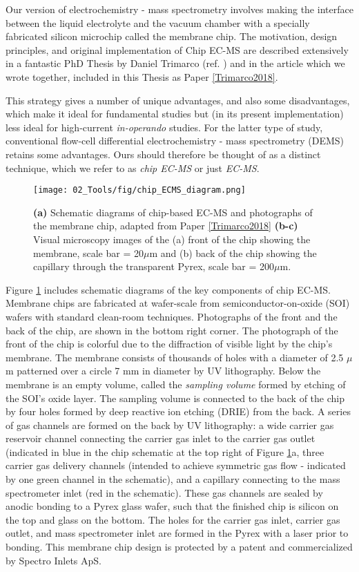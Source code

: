 Our version of electrochemistry - mass spectrometry involves making the interface between the liquid electrolyte and the vacuum chamber with a specially fabricated silicon microchip called the membrane chip. The motivation, design principles, and original implementation of Chip EC-MS are described extensively in a fantastic PhD Thesis by Daniel Trimarco (ref. \cite{Trimarco2017_PhD}) and in the article which we wrote together, included in this Thesis as Paper \ref{Trimarco2018}. 

This strategy gives a number of unique advantages, and also some disadvantages, which make it ideal for fundamental studies but (in its present implementation) less ideal for high-current \textit{in-operando} studies. For the latter type of study, conventional flow-cell differential electrochemistry - mass spectrometry (DEMS)\cite{Baltruschat2004} retains some advantages. Ours should therefore be thought of as a distinct technique, which we refer to as \textit{chip EC-MS} or just \textit{EC-MS}.

\begin{figure}[t]
	\centering
	\texttt{[image: 02\_Tools/fig/chip\_ECMS\_diagram.png]}
	\caption{\textbf{(a)} Schematic diagrams of chip-based EC-MS and photographs of the membrane chip, adapted from Paper \ref{Trimarco2018} \textbf{(b-c)} Visual microscopy images of the (a) front of the chip showing the membrane, scale bar = 20$\mu$m and (b) back of the chip showing the capillary through the transparent Pyrex, scale bar = 200$\mu$m.}
	\label{fig:chipECMS}
\end{figure}

Figure \ref{fig:chipECMS} includes schematic diagrams of the key components of chip EC-MS. Membrane chips are fabricated at wafer-scale from semiconductor-on-oxide (SOI) wafers with standard clean-room techniques. Photographs of the front and the back of the chip, are shown in the bottom right corner. The photograph of the front of the chip is colorful due to the diffraction of visible light by the chip's membrane. The membrane consists of thousands of holes with a diameter of 2.5 $\mu$m patterned over a circle 7 mm in diameter by UV lithography. Below the membrane is an empty volume, called the \textit{sampling volume} formed by etching of the SOI's oxide layer. The sampling volume is connected to the back of the chip by four holes formed by deep reactive ion etching (DRIE) from the back. A series of gas channels are formed on the back by UV lithography: a wide carrier gas reservoir channel connecting the carrier gas inlet to the carrier gas outlet (indicated in blue in the chip schematic at the top right of Figure \ref{fig:chipECMS}a, three carrier gas delivery channels (intended to achieve symmetric gas flow - indicated by one green channel in the schematic), and a capillary connecting to the mass spectrometer inlet (red in the schematic). These gas channels are sealed by anodic bonding to a Pyrex glass wafer, such that the finished chip is silicon on the top and glass on the bottom. The holes for the carrier gas inlet, carrier gas outlet, and mass spectrometer inlet are formed in the Pyrex with a  laser prior to bonding. This membrane chip design is protected by a patent\cite{Trimarco_Patent} and commercialized by Spectro Inlets ApS.


